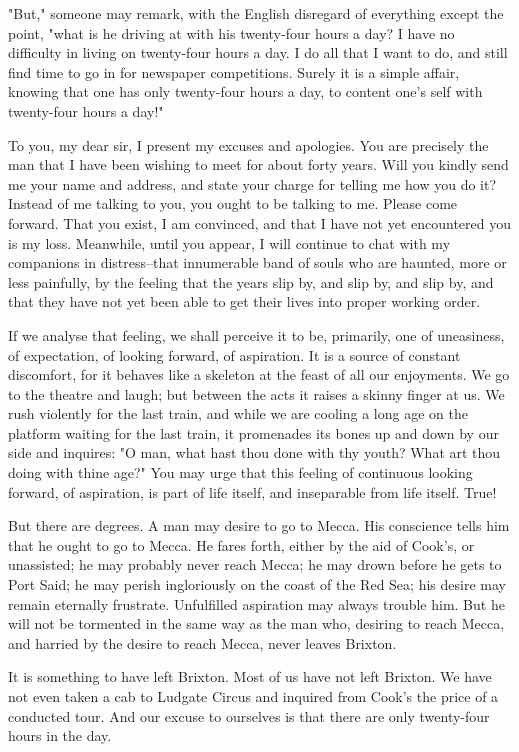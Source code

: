 "But," someone may remark, with the English disregard of everything
except the point, "what is he driving at with his twenty-four hours a
day? I have no difficulty in living on twenty-four hours a day.  I do
all that I want to do, and still find time to go in for newspaper
competitions.  Surely it is a simple affair, knowing that one has only
twenty-four hours a day, to content one's self with twenty-four hours a
day!"

To you, my dear sir, I present my excuses and apologies.  You are
precisely the man that I have been wishing to meet for about forty
years.  Will you kindly send me your name and address, and state your
charge for telling me how you do it?  Instead of me talking to you, you
ought to be talking to me. Please come forward.  That you exist, I am
convinced, and that I have not yet encountered you is my loss.
Meanwhile, until you appear, I will continue to chat with my companions
in distress--that innumerable band of souls who are haunted, more or
less painfully, by the feeling that the years slip by, and slip by, and
slip by, and that they have not yet been able to get their lives into
proper working order.

If we analyse that feeling,  we shall perceive it to be, primarily, one
of uneasiness, of expectation, of looking forward, of aspiration.  It
is a source of constant discomfort, for it behaves like a skeleton at
the feast of all our enjoyments.  We go to the theatre and laugh; but
between the acts it raises a skinny finger at us.  We rush violently
for the last train, and while we are cooling a long age on the platform
waiting for the last train, it promenades its bones up and down by our
side and inquires:  "O man, what hast thou done with thy youth?  What
art thou doing with thine age?"  You may urge that this feeling of
continuous looking forward, of aspiration, is part of life itself, and
inseparable from life itself.  True!

But there are degrees.  A man may desire to go to Mecca.  His
conscience tells him that he ought to go to Mecca.  He fares forth,
either by the aid of Cook's, or unassisted; he may probably never reach
Mecca; he may drown before he gets to Port Said; he may perish
ingloriously on the coast of the Red Sea; his desire may remain
eternally frustrate.  Unfulfilled aspiration may always trouble him.
But he will not be tormented in the same way as the man who, desiring
to reach Mecca, and harried by the desire to reach Mecca, never leaves
Brixton.

It is something to have left Brixton.  Most of us have not left
Brixton.  We have not even taken a cab to Ludgate Circus and inquired
from Cook's the price of a conducted tour.  And our excuse to ourselves
is that there are only twenty-four hours in the day.

